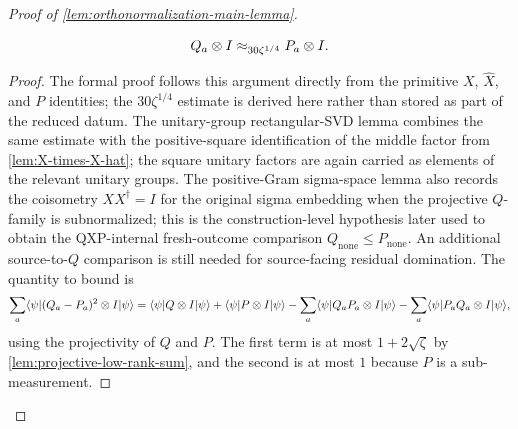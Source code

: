 \begin{proof}[Proof of \ref{lem:orthonormalization-main-lemma}]
	\begin{lemma}[$P$ is close to~$Q$]\label{lem:P-Q-approx}
		\leanok
		\begin{equation*}
			Q_a \otimes I \approx_{30\zeta^{1/4}} P_a \otimes I.
		\end{equation*}
	\end{lemma}
	\begin{proof}
		\leanok
		The formal proof follows this argument directly from the primitive
		$X$, $\widehat X$, and $P$ identities; the $30\zeta^{1/4}$ estimate is
		derived here rather than stored as part of the reduced datum.  The
		unitary-group rectangular-SVD lemma combines the same estimate with the
		positive-square identification of the middle factor from
		\ref{lem:X-times-X-hat}; the square unitary factors are again carried as
		elements of the relevant unitary groups.  The
		positive-Gram sigma-space lemma also records the coisometry
		\(X X^\dagger=I\) for the original sigma embedding when the projective
		\(Q\)-family is subnormalized; this is the construction-level hypothesis
		later used to obtain the QXP-internal fresh-outcome comparison
		\(Q_{\mathrm{none}} \leq P_{\mathrm{none}}\).  An additional
		source-to-\(Q\) comparison is still needed for source-facing residual
		domination.
		The quantity to bound is
		\begin{equation}\label{eq:P-Q-thing-to-bound}
			\sum_a \langle \psi \rvert (Q_a-P_a)^2 \otimes I \lvert \psi \rangle
			=
			\langle \psi \rvert Q \otimes I \lvert \psi \rangle
			+
			\langle \psi \rvert P \otimes I \lvert \psi \rangle
			-
			\sum_a \langle \psi \rvert Q_aP_a \otimes I \lvert \psi \rangle
			-
			\sum_a \langle \psi \rvert P_aQ_a \otimes I \lvert \psi \rangle,
		\end{equation}
		using the projectivity of $Q$ and $P$. The first term is at most $1+2\sqrt{\zeta}$ by \ref{lem:projective-low-rank-sum}, and the second is at most $1$ because $P$ is a sub-measurement.


\end{proof}
\end{proof}
